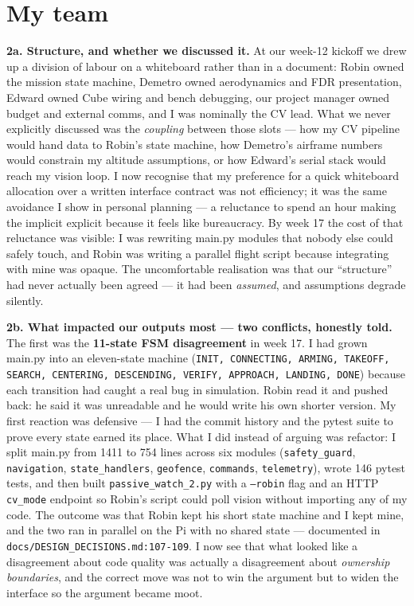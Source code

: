 \section{My team}

\textbf{2a. Structure, and whether we discussed it.} At our week-12 kickoff we drew up a division of labour on a whiteboard rather than in a document: Robin owned the mission state machine, Demetro owned aerodynamics and FDR presentation, Edward owned Cube wiring and bench debugging, our project manager owned budget and external comms, and I was nominally the CV lead. What we never explicitly discussed was the \emph{coupling} between those slots --- how my CV pipeline would hand data to Robin's state machine, how Demetro's airframe numbers would constrain my altitude assumptions, or how Edward's serial stack would reach my vision loop. I now recognise that my preference for a quick whiteboard allocation over a written interface contract was not efficiency; it was the same avoidance I show in personal planning --- a reluctance to spend an hour making the implicit explicit because it feels like bureaucracy. By week 17 the cost of that reluctance was visible: I was rewriting main.py modules that nobody else could safely touch, and Robin was writing a parallel flight script because integrating with mine was opaque. The uncomfortable realisation was that our ``structure'' had never actually been agreed --- it had been \emph{assumed}, and assumptions degrade silently.

\textbf{2b. What impacted our outputs most --- two conflicts, honestly told.} The first was the \textbf{11-state FSM disagreement} in week 17. I had grown main.py into an eleven-state machine (\texttt{INIT, CONNECTING, ARMING, TAKEOFF, SEARCH, CENTERING, DESCENDING, VERIFY, APPROACH, LANDING, DONE}) because each transition had caught a real bug in simulation. Robin read it and pushed back: he said it was unreadable and he would write his own shorter version. My first reaction was defensive --- I had the commit history and the pytest suite to prove every state earned its place. What I did instead of arguing was refactor: I split main.py from 1411 to 754 lines across six modules (\texttt{safety\_guard}, \texttt{navigation}, \texttt{state\_handlers}, \texttt{geofence}, \texttt{commands}, \texttt{telemetry}), wrote 146 pytest tests, and then built \texttt{passive\_watch\_2.py} with a \texttt{--robin} flag and an HTTP \texttt{cv\_mode} endpoint so Robin's script could poll vision without importing any of my code. The outcome was that Robin kept his short state machine and I kept mine, and the two ran in parallel on the Pi with no shared state --- documented in \texttt{docs/DESIGN\_DECISIONS.md:107-109}. I now see that what looked like a disagreement about code quality was actually a disagreement about \emph{ownership boundaries}, and the correct move was not to win the argument but to widen the interface so the argument became moot.

